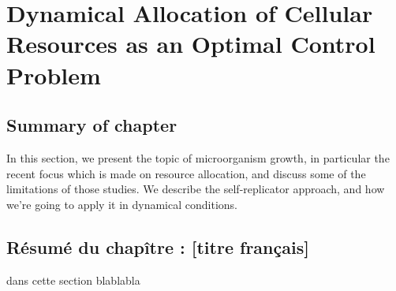 \chapter{Dynamical Allocation of Cellular Resources as an Optimal Control Problem}

\section*{Summary of chapter \thechapter}
In this section, we present the topic of microorganism growth, in particular the recent focus which is made on resource allocation, and discuss some of the limitations of those studies.
We describe the self-replicator approach, and how we're going to apply it in dynamical conditions.

\section*{Résumé du chapître \thechapter : [titre français]}
dans cette section blablabla
